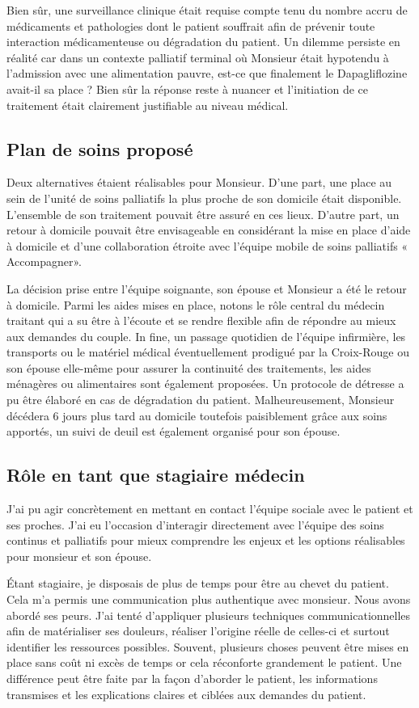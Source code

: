 Bien sûr, une surveillance clinique était requise compte tenu du nombre accru de médicaments et pathologies dont le patient souffrait afin de prévenir toute interaction médicamenteuse ou dégradation du patient. 
Un dilemme persiste en réalité car dans un contexte palliatif terminal où Monsieur était hypotendu à l’admission avec une alimentation pauvre, est-ce que finalement le Dapagliflozine avait-il sa place ? Bien sûr la réponse reste à nuancer et l’initiation de ce traitement était clairement justifiable au niveau médical. 

\subsection{Plan de soins proposé} 

Deux alternatives étaient réalisables pour Monsieur. D’une part, une place au sein de l’unité de soins palliatifs la plus proche de son domicile était disponible. L’ensemble de son traitement pouvait être assuré en ces lieux. D’autre part, un retour à domicile pouvait être envisageable en considérant la mise en place d’aide à domicile et d’une collaboration étroite avec l’équipe mobile de soins palliatifs « Accompagner».

La décision prise entre l’équipe soignante, son épouse et Monsieur a été le retour à domicile. Parmi les aides mises en place, notons le rôle central du médecin traitant qui a su être à l’écoute et se rendre flexible afin de répondre au mieux aux demandes du couple. In fine, un passage quotidien de l’équipe infirmière, les transports ou le matériel médical éventuellement prodigué par la Croix-Rouge ou son épouse elle-même pour assurer la continuité des traitements, les aides ménagères ou alimentaires sont également proposées. Un protocole de détresse a pu être élaboré en cas de dégradation du patient. Malheureusement, Monsieur décédera 6 jours plus tard au domicile toutefois paisiblement grâce aux soins apportés, un suivi de deuil est également organisé pour son épouse.

\subsection{Rôle en tant que stagiaire médecin} 

J’ai pu agir concrètement en mettant en contact l’équipe sociale avec le patient et ses proches. J’ai eu l’occasion d’interagir directement avec l’équipe des soins continus et palliatifs pour mieux comprendre les enjeux et les options réalisables pour monsieur et son épouse.

Étant stagiaire, je disposais de plus de temps pour être au chevet du patient. Cela m’a permis une communication plus authentique avec monsieur. Nous avons abordé ses peurs. J’ai tenté d’appliquer plusieurs techniques communicationnelles afin de matérialiser ses douleurs, réaliser l’origine réelle de celles-ci et surtout identifier les ressources possibles. Souvent, plusieurs choses peuvent être mises en place sans coût ni excès de temps or cela réconforte grandement le patient. Une différence peut être faite par la façon d’aborder le patient, les informations transmises et les explications claires et ciblées aux demandes du patient.  

 
